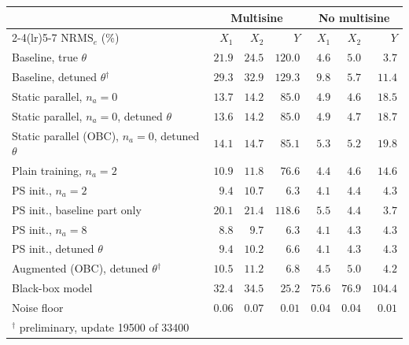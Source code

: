 \setlength{\tabcolsep}{3pt}
\begin{tabular}{l r r r r r r}
\toprule
 & \multicolumn{3}{c}{Multisine} & \multicolumn{3}{c}{No multisine}\\
\cmidrule(lr){2-4}\cmidrule(lr){5-7}
$\mathrm{NRMS}_e$ (\%) & $X_1$ & $X_2$ & $Y$ & $X_1$ & $X_2$ & $Y$\\
\midrule
Baseline, true $\theta$ & $21.9$ & $24.5$ & $120.0$ & $4.6$ & $5.0$ & $3.7$\\
Baseline, detuned $\theta$$^\dagger$ & $29.3$ & $32.9$ & $129.3$ & $9.8$ & $5.7$ & $11.4$\\
Static parallel, $n_a{=}0$ & $13.7$ & $14.2$ & $85.0$ & $4.9$ & $4.6$ & $18.5$\\
Static parallel, $n_a{=}0$, detuned $\theta$ & $13.6$ & $14.2$ & $85.0$ & $4.9$ & $4.7$ & $18.7$\\
Static parallel (OBC), $n_a{=}0$, detuned $\theta$ & $14.1$ & $14.7$ & $85.1$ & $5.3$ & $5.2$ & $19.8$\\
Plain training, $n_a{=}2$ & $10.9$ & $11.8$ & $76.6$ & $4.4$ & $4.6$ & $14.6$\\
PS init., $n_a{=}2$ & $9.4$ & $10.7$ & $6.3$ & $4.1$ & $4.4$ & $4.3$\\
PS init., baseline part only & $20.1$ & $21.4$ & $118.6$ & $5.5$ & $4.4$ & $3.7$\\
PS init., $n_a{=}8$ & $8.8$ & $9.7$ & $6.3$ & $4.1$ & $4.3$ & $4.3$\\
PS init., detuned $\theta$ & $9.4$ & $10.2$ & $6.6$ & $4.1$ & $4.3$ & $4.3$\\
\midrule
Augmented (OBC), detuned $\theta$$^\dagger$ & $10.5$ & $11.2$ & $6.8$ & $4.5$ & $5.0$ & $4.2$\\
\midrule
Black-box model & $32.4$ & $34.5$ & $25.2$ & $75.6$ & $76.9$ & $104.4$\\
\midrule
Noise floor & $0.06$ & $0.07$ & $0.01$ & $0.04$ & $0.04$ & $0.01$\\
\bottomrule
\multicolumn{7}{l}{\footnotesize $^\dagger$ preliminary, update 19500 of 33400}\\
\end{tabular}

